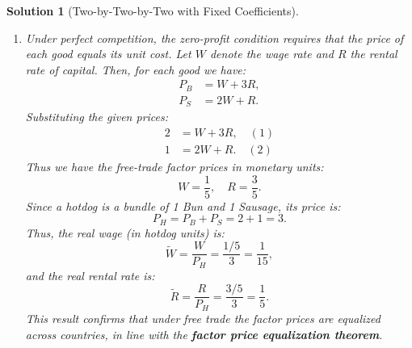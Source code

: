 \documentclass[a4paper,12pt]{article} %
\theoremstyle{nonitalic}
\newtheorem{solution}{Solution}
\begin{document}
\begin{solution}[Two-by-Two-by-Two with Fixed Coefficients]
\begin{enumerate}
\begin{enumerate}
                    
                    \item[(b)] Under perfect competition, the zero-profit condition requires that the price of each good equals its unit cost. Let \(W\) denote the wage rate and \(R\) the rental rate of capital. Then, for each good we have:
                    \begin{align*}
                    P_B &= W + 3R, \\
                    P_S &= 2W + R.
                    \end{align*}
                    Substituting the given prices:
                    \begin{align*}
                    2 &= W + 3R, \quad (1)\\
                    1 &= 2W + R. \quad (2)
                    \end{align*}
                    Thus we have the free-trade factor prices in monetary units:
                    \[
                    W = \frac{1}{5}, \quad R = \frac{3}{5}.
                    \]
                    Since a hotdog is a bundle of 1 Bun and 1 Sausage, its price is:
                    \[
                    P_H = P_B + P_S = 2 + 1 = 3.
                    \]
                    Thus, the real wage (in hotdog units) is:
                    \[
                    \tilde{W} = \frac{W}{P_H} = \frac{1/5}{3} = \frac{1}{15},
                    \]
                    and the real rental rate is:
                    \[
                    \tilde{R} = \frac{R}{P_H} = \frac{3/5}{3} = \frac{1}{5}.
                    \]
                    This result confirms that under free trade the factor prices are equalized across countries, 
                    in line with the \textbf{factor price equalization theorem}.


\end{enumerate}
\end{enumerate}
\end{solution}
\end{document}
